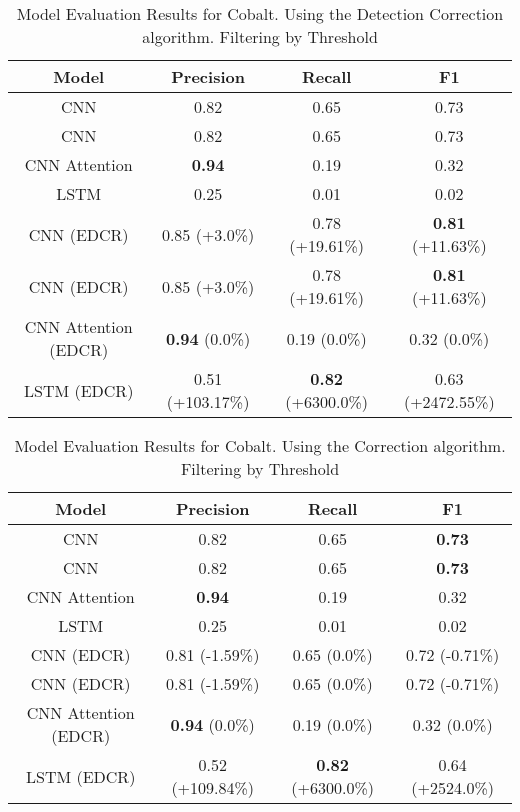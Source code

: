 \begin{table}
\centering
\begin{tabular}{|c|c|c|c|}
\hline
Model & Precision & Recall & F1\\
\hline
CNN  & 0.82 & 0.65 & 0.73\\
CNN  & 0.82 & 0.65 & 0.73\\
CNN Attention & \textbf{0.94} & 0.19 & 0.32\\
LSTM  & 0.25 & 0.01 & 0.02\\

\hline
CNN  (EDCR) & 0.85 (+3.0\%) & 0.78 (+19.61\%) & \textbf{0.81} (+11.63\%)\\
CNN  (EDCR) & 0.85 (+3.0\%) & 0.78 (+19.61\%) & \textbf{0.81} (+11.63\%)\\
CNN Attention (EDCR) & \textbf{0.94} (0.0\%) & 0.19 (0.0\%) & 0.32 (0.0\%)\\
LSTM  (EDCR) & 0.51 (+103.17\%) & \textbf{0.82} (+6300.0\%) & 0.63 (+2472.55\%)\\

\hline
\end{tabular}
\caption{Model Evaluation Results for Cobalt. Using the Detection Correction algorithm. Filtering by Threshold}
\end{table}
\begin{table}
\centering
\begin{tabular}{|c|c|c|c|}
\hline
Model & Precision & Recall & F1\\
\hline
CNN  & 0.82 & 0.65 & \textbf{0.73}\\
CNN  & 0.82 & 0.65 & \textbf{0.73}\\
CNN Attention & \textbf{0.94} & 0.19 & 0.32\\
LSTM  & 0.25 & 0.01 & 0.02\\

\hline
CNN  (EDCR) & 0.81 (-1.59\%) & 0.65 (0.0\%) & 0.72 (-0.71\%)\\
CNN  (EDCR) & 0.81 (-1.59\%) & 0.65 (0.0\%) & 0.72 (-0.71\%)\\
CNN Attention (EDCR) & \textbf{0.94} (0.0\%) & 0.19 (0.0\%) & 0.32 (0.0\%)\\
LSTM  (EDCR) & 0.52 (+109.84\%) & \textbf{0.82} (+6300.0\%) & 0.64 (+2524.0\%)\\

\hline
\end{tabular}
\caption{Model Evaluation Results for Cobalt. Using the Correction algorithm. Filtering by Threshold}
\end{table}

